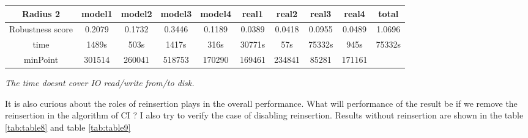 \documentclass{article}
\begin{document}
\begin{table}[]
\begin{adjustwidth}{-1cm}{}
\begin{threeparttable}
\begin{tabular}{|c|c|c|c|c|c|c|c|c|c|}
				\textbf{Radius 2} & \textbf{model1} & \textbf{model2} & \textbf{model3} & \textbf{model4} & \textbf{real1} & \textbf{real2} & \textbf{real3} & \textbf{real4} & \textbf{total} \\ \hline
				Robustness score                 & 0.2079&0.1732&0.3446&0.1189&0.0389&0.0418&0.0955&0.0489&1.0696         \\ \hline
				time                             &  1489s&503s&1417s&316s&30771s&57s&75332s&945s&75332s
				         \\ \hline
				minPoint                         & 301514&260041&518753&170290&169461&234841&85281&171161
				     &                \\ \hline				
			\end{tabular}
			\begin{tablenotes}
				\small
				\item\textit{ The time doesn\textquotesingle t cover IO read/write from/to disk.}
			\end{tablenotes}			
		\end{threeparttable}
		\end{adjustwidth}	
	\end{table}	
	
	It is also curious about the roles of reinsertion plays in the overall performance. What will performance of the result be if we remove the reinsertion in the algorithm of CI ? I also try to verify the case of disabling reinsertion. Results without reinsertion are shown in the table \ref{tab:table8} and table \ref{tab:table9} 
	
\end{document}
